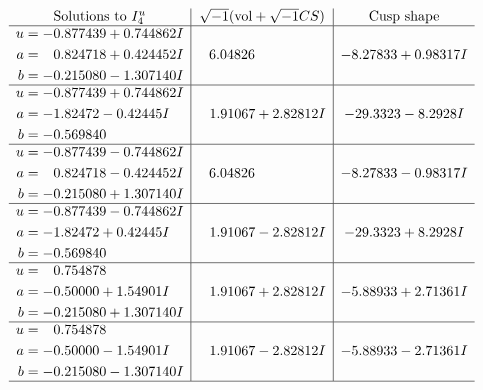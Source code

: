 \documentclass[1p]{elsarticle_modified}
\theoremstyle{definition}
\newcommand{\I}{\sqrt{-1}}
\begin{document}
$$\begin{array}{c|c|c}  
\text{Solutions to }I^u_{4}& \I (\text{vol} + \sqrt{-1}CS) & \text{Cusp shape}\\
 \hline 
\begin{aligned}
u &= -0.877439 + 0.744862 I \\
a &= \phantom{-}0.824718 + 0.424452 I \\
b &= -0.215080 - 1.307140 I\end{aligned}
 & \phantom{-}6.04826\phantom{ +0.000000I} & -8.27833 + 0.98317 I \\ \hline\begin{aligned}
u &= -0.877439 + 0.744862 I \\
a &= -1.82472 - 0.42445 I \\
b &= -0.569840\phantom{ +0.000000I}\end{aligned}
 & \phantom{-}1.91067 + 2.82812 I & -29.3323 - 8.2928 I \\ \hline\begin{aligned}
u &= -0.877439 - 0.744862 I \\
a &= \phantom{-}0.824718 - 0.424452 I \\
b &= -0.215080 + 1.307140 I\end{aligned}
 & \phantom{-}6.04826\phantom{ +0.000000I} & -8.27833 - 0.98317 I \\ \hline\begin{aligned}
u &= -0.877439 - 0.744862 I \\
a &= -1.82472 + 0.42445 I \\
b &= -0.569840\phantom{ +0.000000I}\end{aligned}
 & \phantom{-}1.91067 - 2.82812 I & -29.3323 + 8.2928 I \\ \hline\begin{aligned}
u &= \phantom{-}0.754878\phantom{ +0.000000I} \\
a &= -0.50000 + 1.54901 I \\
b &= -0.215080 + 1.307140 I\end{aligned}
 & \phantom{-}1.91067 + 2.82812 I & -5.88933 + 2.71361 I \\ \hline\begin{aligned}
u &= \phantom{-}0.754878\phantom{ +0.000000I} \\
a &= -0.50000 - 1.54901 I \\
b &= -0.215080 - 1.307140 I\end{aligned}
 & \phantom{-}1.91067 - 2.82812 I & -5.88933 - 2.71361 I\\
 \hline 
 \end{array}$$\newpage
\end{document}
